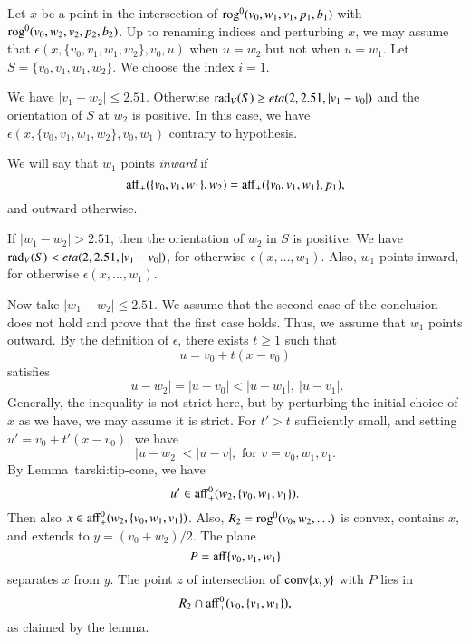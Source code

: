 \begin{tarskidata}
\begin{tarski}
\begin{proved}
Let $x$ be a point in the intersection of ${\operatorname{rog}}^0(v_0,w_1,v_1,p_1,b_1)$ 
with ${\operatorname{rog}}^0(v_0,w_2,v_2,p_2,b_2)$.  Up to renaming indices and perturbing $x$,
we may assume that
$\epsilon(x,\{v_0,v_1,w_1,w_2\},v_0,u)$ when $u=w_2$ but not when $u=w_1$.  
Let $S=\{v_0,v_1,w_1,w_2\}$.
We choose the index $i=1$.

We have $|v_1-w_2|\le 2.51$. 
Otherwise $\operatorname{rad}_V(S) \ge eta(2,2.51,|v_1-v_0|)$ and
the orientation of $S$ at $w_2$ is positive.  In this case, we have
$\epsilon(x,\{v_0,v_1,w_1,w_2\},v_0,w_1)$ contrary to hypothesis.  

We will say that $w_1$ points {\it inward} if
     $$
     {\operatorname{aff}}_+(\{v_0,v_1,w_1\},w_2) = {\operatorname{aff}}_+(\{v_0,v_1,w_1\},p_1),
     $$
and outward otherwise.

If $|w_1-w_2|> 2.51$, then the orientation of $w_2$ in $S$ is positive.
We have $\operatorname{rad}_V(S) < eta(2,2.51,|v_1-v_0|)$, for otherwise
$\epsilon(x,\ldots,w_1)$.   Also, $w_1$ points inward, for otherwise
$\epsilon(x,\ldots,w_1)$.

Now take $|w_1-w_2|\le 2.51$. 
We assume that the second case of the conclusion does not hold and prove that
the first case holds.  Thus, we assume that $w_1$ points outward.
By the definition of $\epsilon$, there exists $t\ge 1$ such
that $$u = v_0 + t (x- v_0)$$ satisfies
$$|u - w_2|=|u-v_0| < |u-w_1|,\ |u-v_1|.$$
Generally, the inequality is not strict here, but by perturbing the initial
choice of $x$ as we have, we may assume it is strict.
For $t'>t$ sufficiently small, and setting $u' = v_0 + t'(x-v_0)$, we
have
$$
  |u - w_2| < |u-v|, \text{ for } v = v_0,w_1,v_1.
$$
By Lemma~{tarski:tip-cone}, we have
$$
  u' \in {\operatorname{aff}}_+^0(w_2,\{v_0,w_1,v_1\}).
$$
Then also $x \in{\operatorname{aff}}_+^0(w_2,\{v_0,w_1,v_1\})$.
Also, $R_2 = {\operatorname{rog}}^0(v_0,w_2,\ldots)$
is convex, contains $x$, and extends to $y=(v_0+w_2)/2$.  
The plane
$$P  ={\operatorname{aff}}\{v_0,v_1,w_1\}$$ separates $x$ from $y$.  The point $z$
of intersection of ${\operatorname{conv}}\{x,y\}$ with $P$ lies in
   $$R_2 \cap {\operatorname{aff}}_+^0(v_0,\{v_1,w_1\}),$$
as claimed by the lemma.
\swallowed\end{proved}
\end{tarski}











\end{tarskidata}
